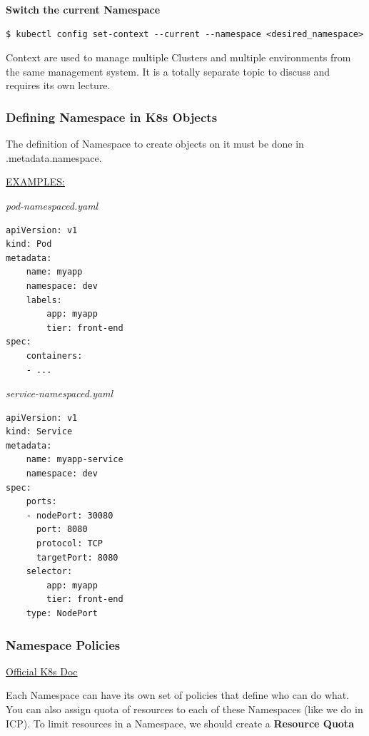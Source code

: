 \documentclass{article}
\newenvironment{blocktemplateI}[1]{%
    \tcolorbox[beamer,%
    noparskip,breakable,
    colframe=Violet,%
    colbacklower=Black,%
    title=#1]}%
    {\endtcolorbox}
\newenvironment{codetemplate}[1][]{%
  \mybasecolorbox[#1]
  \itshape
}{%
  \endmybasecolorbox
}
\begin{document}
\textbf{Switch the current Namespace}
\begin{codetemplate}{}
\begin{verbatim}
$ kubectl config set-context --current --namespace <desired_namespace>
\end{verbatim}
\end{codetemplate}

\begin{blocktemplateI}{NOTE}
Context are used to manage multiple Clusters and multiple environments from the same management system. It is a totally separate topic to discuss and requires its own lecture.
\end{blocktemplateI}

\subsubsection{Defining Namespace in K8s Objects}

The definition of Namespace to create objects on it must be done in .metadata.namespace.

\underline{EXAMPLES:}

\begin{codetemplate}{pod-namespaced.yaml}
\begin{verbatim}
apiVersion: v1
kind: Pod
metadata:
    name: myapp
    namespace: dev
    labels:
        app: myapp
        tier: front-end
spec:
    containers:
    - ...
\end{verbatim}
\end{codetemplate}

\begin{codetemplate}{service-namespaced.yaml}
\begin{verbatim}
apiVersion: v1
kind: Service
metadata:
    name: myapp-service
    namespace: dev
spec:
    ports:
    - nodePort: 30080
      port: 8080
      protocol: TCP
      targetPort: 8080
    selector:
        app: myapp
        tier: front-end
    type: NodePort 
\end{verbatim}
\end{codetemplate}

\subsubsection{Namespace Policies}

\href{https://kubernetes.io/docs/concepts/policy/resource-quotas/}{Official K8s Doc}

\label{Quota}
Each Namespace can have its own set of policies that define who can do what. You can also assign quota of resources to each of these Namespaces (like we do in ICP). To limit resources in a Namespace, we should create a \textbf{Resource Quota}
\end{document}
